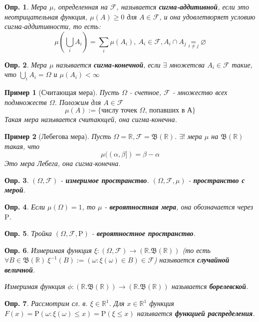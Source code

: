 \documentclass[10pt]{article}
\newtheorem{definition}{Опр.}
\newtheorem{example}{Пример}[definition]
\theoremstyle{theorem}
\newcommand\defin[1]{\textbf{#1}}
\def\R{
    \mathbb{R}
}
\def\P{
    \mathrm{P}
}
\def\F{
    \mathcal{F}
}
\def\B{
    \mathfrak{B}
}
\begin{document}
\begin{definition}
    Мера $\mu$, определенная на $\F$, называется \defin{сигма-аддитивной},
    если это неотрицательная функция, $\mu(A) \geq 0$ для $A \in \F$,
    и она удовлетворяет условию сигма-аддитивности, то есть:
    $$\mu(\bigcup_iA_i) = \sum_i\mu(A_i), \ A_i \in \F, A_i \cap A_j \underset{i \neq j}{=} \varnothing $$
\end{definition}
\begin{definition}
    Мера $\mu$ называется \defin{сигма-конечной}, если $\exists$ множетсва $A_i \in \F$
    такие, что $\bigcup_iA_i = \Omega$ и $\mu(A_i) < \infty$
\end{definition}
\begin{example}[Считающая мера]
    Пусть $\Omega$ - счетное, $\F$ - множество всех подмножеств $\Omega$.
    Положим для $A \in \F$
    $$\mu(A) := \{ \mbox{числу точек $\Omega$, попавших в А}\}$$
    Такая мера называется считающей, она сигма-конечна.
\end{example}
\begin{example}[Лебегова мера]
    Пусть $\Omega = \R, \F = \B(\R)$. $\exists!$ мера
    $\mu$ на $\B(\R)$ такая, что 
    $$\mu((\alpha, \beta]) = \beta - \alpha$$
    Это мера Лебега, она сигма-конечна.
\end{example}
\begin{definition}
    $(\Omega, \F)$ - \defin{измеримое пространство}.
    $(\Omega, \F, \mu)$ - \defin{пространство с мерой}.
\end{definition}
\begin{definition}
    Если $\mu(\Omega) = 1$, то $\mu$ - \defin{вероятностная мера}, она обозначается
    через $\P$.
\end{definition}
\begin{definition}
    Тройка $(\Omega, \F, \P)$ - \defin{вероятностное пространство}.
\end{definition}
\begin{definition}
    Измеримая функция $\xi: (\Omega, \F) \rightarrow (\R. \B(\R))$
    (то есть $\forall B \in \B(\R)\ \xi^{-1}(B):=(\omega:\xi(\omega)\in B) \in \F$)
    называется \defin{случайной величной}.

    Измеримая функция $\phi:(\R. \B(\R)) \rightarrow (\R. \B(\R))$
    называется \defin{борелевской}.
\end{definition}
\begin{definition}
    Рассмотрим сл. в. $\xi \in \R^1$. Для $x \in \R^1$ функция 
    $F(x) = \P(\omega: \xi(\omega) \leq x) = \P(\xi \leq x)$ называется
    \defin{функцией распределения}.
\end{definition}
\end{document}
